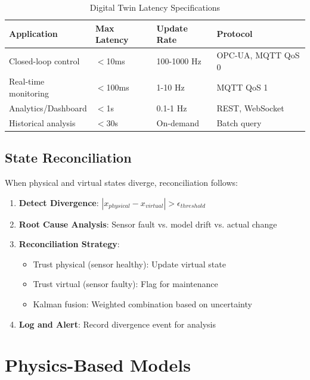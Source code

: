 \documentclass[12pt,a4paper]{article}
\begin{document}
\begin{table}[H]
\centering
\caption{Digital Twin Latency Specifications}
\begin{tabular}{llll}
\toprule
\textbf{Application} & \textbf{Max Latency} & \textbf{Update Rate} & \textbf{Protocol} \\
\midrule
Closed-loop control & $<$10ms & 100-1000 Hz & OPC-UA, MQTT QoS 0 \\
Real-time monitoring & $<$100ms & 1-10 Hz & MQTT QoS 1 \\
Analytics/Dashboard & $<$1s & 0.1-1 Hz & REST, WebSocket \\
Historical analysis & $<$30s & On-demand & Batch query \\
\bottomrule
\end{tabular}
\end{table}

\subsection{State Reconciliation}

When physical and virtual states diverge, reconciliation follows:

\begin{enumerate}
    \item \textbf{Detect Divergence}: $|x_{physical} - x_{virtual}| > \epsilon_{threshold}$
    \item \textbf{Root Cause Analysis}: Sensor fault vs. model drift vs. actual change
    \item \textbf{Reconciliation Strategy}:
    \begin{itemize}
        \item Trust physical (sensor healthy): Update virtual state
        \item Trust virtual (sensor faulty): Flag for maintenance
        \item Kalman fusion: Weighted combination based on uncertainty
    \end{itemize}
    \item \textbf{Log and Alert}: Record divergence event for analysis
\end{enumerate}

\section{Physics-Based Models}
\end{document}
